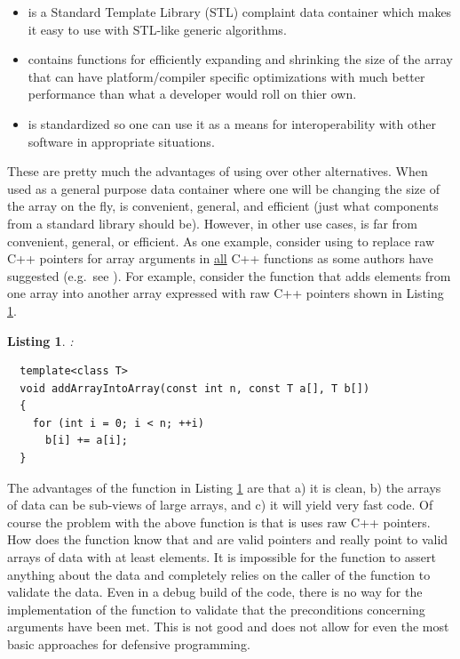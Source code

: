 \documentclass[pdf,ps2pdf,11pt]{SANDreport}
\newtheorem{listing}{Listing}
\begin{document}
\begin{itemize}

{}\item{} is a Standard Template Library (STL)
complaint data container which makes it easy to use with STL-like
generic algorithms.

{}\item{} contains functions for efficiently expanding
and shrinking the size of the array that can have platform/compiler
specific optimizations with much better performance than what a
developer would roll on thier own.

{}\item{} is standardized so one can use it as a means
for interoperability with other software in appropriate situations.

\end{itemize}

These are pretty much the advantages of using {} over
other alternatives.  When used as a general purpose data container
where one will be changing the size of the array on the fly,
{} is convenient, general, and efficient (just what
components from a standard library should be).  However, in other use
cases, {} is far from convenient, general, or
efficient.  As one example, consider using {} to
replace raw C++ pointers for array arguments in {}\underline{all} C++
functions as some authors have suggested (e.g.\ see
{}\cite{Modernizing-the-C++-Interface-to-MPI}).  For example, consider
the function that adds elements from one array into another array
expressed with raw C++ pointers shown in Listing
{}\ref{listing:addArrayIntoArray-raw}.

\begin{listing}:\\
\label{listing:addArrayIntoArray-raw}
{\small\begin{verbatim}
  template<class T>
  void addArrayIntoArray(const int n, const T a[], T b[])
  {
    for (int i = 0; i < n; ++i)
      b[i] += a[i];
  }
\end{verbatim}}
\end{listing}

The advantages of the function in Listing
{}\ref{listing:addArrayIntoArray-raw} are that a) it is clean, b) the
arrays of data can be sub-views of large arrays, and c) it will yield
very fast code.  Of course the problem with the above function
{} is that is uses raw C++ pointers.  How
does the function {} know that
{} and {} are valid pointers and really point to
valid arrays of data with at least {} elements.  It is
impossible for the function {} to
assert anything about the data and completely relies on the caller of
the function to validate the data.  Even in a debug build of the code,
there is no way for the implementation of the function
{} to validate that the preconditions
concerning arguments have been met.  This is not good and does not
allow for even the most basic approaches for defensive programming.
\end{document}

